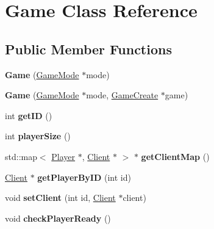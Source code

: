 \hypertarget{class_game}{\section{Game Class Reference}
\label{class_game}
}
\subsection*{Public Member Functions}
\begin{DoxyCompactItemize}
\item 
\hypertarget{class_game_a49c46e4f1654394c5a001638d373bf5a}{{\bfseries Game} (\hyperlink{class_game_mode}{Game\-Mode} $\ast$mode)}\label{class_game_a49c46e4f1654394c5a001638d373bf5a}

\item 
\hypertarget{class_game_af5cd394cec7b82092a9228ce817ec681}{{\bfseries Game} (\hyperlink{class_game_mode}{Game\-Mode} $\ast$mode, \hyperlink{class_game_create}{Game\-Create} $\ast$game)}\label{class_game_af5cd394cec7b82092a9228ce817ec681}

\item 
\hypertarget{class_game_a1dd99bb4968cda59c200d0a7b8cb09aa}{int {\bfseries get\-I\-D} ()}\label{class_game_a1dd99bb4968cda59c200d0a7b8cb09aa}

\item 
\hypertarget{class_game_a2823038b520dabfaaf8bb81a3efb5068}{int {\bfseries player\-Size} ()}\label{class_game_a2823038b520dabfaaf8bb81a3efb5068}

\item 
\hypertarget{class_game_a28bca912fb12b7b44b0e4924ae070197}{std\-::map$<$ \hyperlink{class_player}{Player} $\ast$, \hyperlink{class_client}{Client} $\ast$ $>$ $\ast$ {\bfseries get\-Client\-Map} ()}\label{class_game_a28bca912fb12b7b44b0e4924ae070197}

\item 
\hypertarget{class_game_abc2c42ae2c3eee5faf479264dd8c74e7}{\hyperlink{class_client}{Client} $\ast$ {\bfseries get\-Player\-By\-I\-D} (int id)}\label{class_game_abc2c42ae2c3eee5faf479264dd8c74e7}

\item 
\hypertarget{class_game_a575b2f8b09b359b47f99545c557dec0d}{void {\bfseries set\-Client} (int id, \hyperlink{class_client}{Client} $\ast$client)}\label{class_game_a575b2f8b09b359b47f99545c557dec0d}

\item 
\hypertarget{class_game_a0b6b1200ab7709b839068fe256fc7310}{void {\bfseries check\-Player\-Ready} ()}\label{class_game_a0b6b1200ab7709b839068fe256fc7310}


\end{DoxyCompactItemize}
